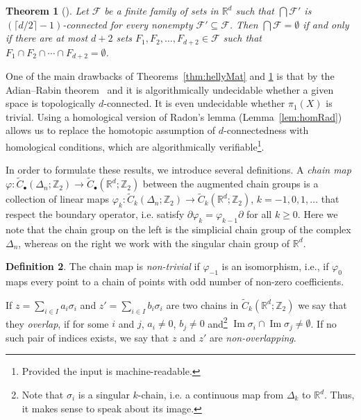\documentclass[a4paper,12pt]{amsart}
\newcommand{\R}{\mathbb{R}} 	%
\newcommand{\Z}{\mathbb{Z}} 	%
\newtheorem{theorem}{Theorem}
\theoremstyle{definition}
\newtheorem{definition}[theorem]{Definition}
\begin{document}
\begin{theorem}[\cite{hb17,m-httucs-97}]\label{thm:hVanKampenBound}
 Let $\mathcal F$ be a finite family of sets in $\R^d$ such that $\bigcap \mathcal F'$ is $(\lceil d/2\rceil -1)$-connected for every nonempty $\mathcal F'\subseteq\mathcal F$. Then $\bigcap \mathcal F=\emptyset$ if and only if there are at most $d+2$ sets $F_1,F_2,\ldots, F_{d+2}\in\mathcal F$ such that $F_1\cap F_2\cap\cdots\cap F_{d+2}=\emptyset$.
\end{theorem}
One of the main drawbacks of Theorems~\ref{thm:hellyMat} and \ref{thm:hVanKampenBound} is that by the Adian--Rabin theorem~\cite{Rabin58} and \cite[Prop~1.26]{Hatcher:AlgebraicTopology-2002} it is algorithmically undecidable whether a given space is topologically $d$-connected. It is even undecidable whether $\pi_1(X)$ is trivial.
Using a homological version of Radon's lemma (Lemma~\ref{lem:homRad}) allows us to replace the homotopic assumption of $d$-connectedness with homological conditions, which are algorithmically verifiable\footnote{Provided the input is machine-readable.}.

In order to formulate these results, we introduce several definitions.
A \emph{chain map} $\varphi\colon \widetilde{C}_\bullet(\Delta_n;\Z_2)\to \widetilde{C}_\bullet(\R^d;\Z_2)$ between the augmented chain groups is a collection of linear maps $\varphi_k\colon \widetilde{C}_k(\Delta_n;\Z_2)\to \widetilde{C}_k(\R^d;\Z_2)$, $k=-1,0,1,\ldots$
that respect the boundary operator,
i.e. satisfy $\partial \varphi_k = \varphi_{k-1}\partial$ for all $k\geq 0$.
Here we note that the chain group on the left is the simplicial chain group of the complex $\Delta_n$, whereas on the right we work with the singular chain group of $\R^d$.


\begin{definition}\label{d:non-trivial_chain_map}
The chain map is \emph{non-trivial} if $\varphi_{-1}$ is an isomorphism, i.e., if $\varphi_0$ maps every point to a chain of points with odd number of non-zero coefficients.

If $z=\sum_{i\in I}a_i\sigma_i$ 
and $z'=\sum_{i\in I}b_i\sigma_i$ are two chains in $\widetilde{C}_k(\R^d;\Z_2)$
we say that they \emph{overlap},
if for some $i$ and $j$,
$a_i\neq 0$, $b_j\neq 0$
and\footnote{Note that $\sigma_i$ is a singular $k$-chain, i.e. a continuous map from $\Delta_k$ to $\R^d$. Thus, it makes sense to speak about its image.} $\operatorname{Im}\sigma_i \cap \operatorname{Im}\sigma_j \neq \emptyset$.
If no such pair of indices exists, we say that $z$ and $z'$ are \emph{non-overlapping}. 
\end{definition}
\end{document}
